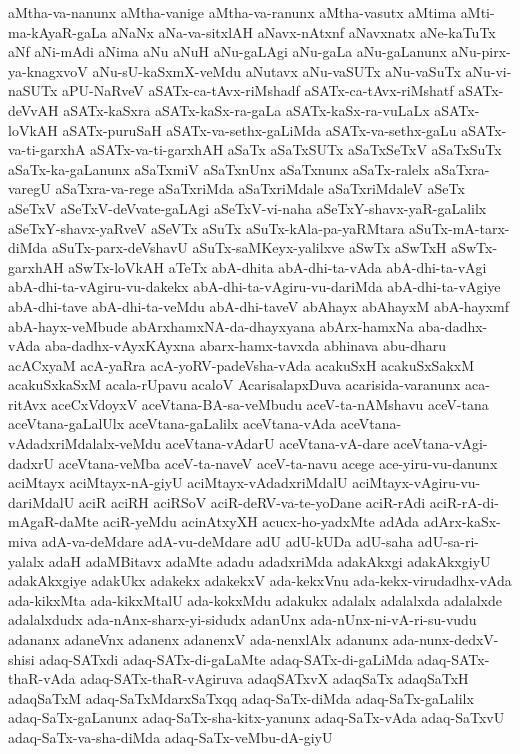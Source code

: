 {aMtha-va-nanunx
aMtha-vanige
aMtha-va-ranunx
aMtha-vasutx
aMtima
aMti-ma-kAyaR-gaLa
aNaNx
aNa-va-sitxlAH
aNavx-nAtxnf
aNavxnatx
aNe-kaTuTx
aNf
aNi-mAdi
aNima
aNu
aNuH
aNu-gaLAgi
aNu-gaLa
aNu-gaLanunx
aNu-pirx-ya-knagxvoV
aNu-sU-kaSxmX-veMdu
aNutavx
aNu-vaSUTx
aNu-vaSuTx
aNu-vi-naSUTx
aPU-NaRveV
aSATx-ca-tAvx-riMshadf
aSATx-ca-tAvx-riMshatf
aSATx-deVvAH
aSATx-kaSxra
aSATx-kaSx-ra-gaLa
aSATx-kaSx-ra-vuLaLx
aSATx-loVkAH
aSATx-puruSaH
aSATx-va-sethx-gaLiMda
aSATx-va-sethx-gaLu
aSATx-va-ti-garxhA
aSATx-va-ti-garxhAH
aSaTx
aSaTxSUTx
aSaTxSeTxV
aSaTxSuTx
aSaTx-ka-gaLanunx
aSaTxmiV
aSaTxnUnx
aSaTxnunx
aSaTx-ralelx
aSaTxra-varegU
aSaTxra-va-rege
aSaTxriMda
aSaTxriMdale
aSaTxriMdaleV
aSeTx
aSeTxV
aSeTxV-deVvate-gaLAgi
aSeTxV-vi-naha
aSeTxY-shavx-yaR-gaLalilx
aSeTxY-shavx-yaRveV
aSeVTx
aSuTx
aSuTx-kAla-pa-yaRMtara
aSuTx-mA-tarx-diMda
aSuTx-parx-deVshavU
aSuTx-saMKeyx-yalilxve
aSwTx
aSwTxH
aSwTx-garxhAH
aSwTx-loVkAH
aTeTx
abA-dhita
abA-dhi-ta-vAda
abA-dhi-ta-vAgi
abA-dhi-ta-vAgiru-vu-dakekx
abA-dhi-ta-vAgiru-vu-dariMda
abA-dhi-ta-vAgiye
abA-dhi-tave
abA-dhi-ta-veMdu
abA-dhi-taveV
abAhayx
abAhayxM
abA-hayxmf
abA-hayx-veMbude
abArxhamxNA-da-dhayxyana
abArx-hamxNa
aba-dadhx-vAda
aba-dadhx-vAyxKAyxna
abarx-hamx-tavxda
abhinava
abu-dharu
acACxyaM
acA-yaRra
acA-yoRV-padeVsha-vAda
acakuSxH
acakuSxSakxM
acakuSxkaSxM
acala-rUpavu
acaloV
AcarisalapxDuva
acarisida-varanunx
aca-ritAvx
aceCxVdoyxV
aceVtana-BA-sa-veMbudu
aceV-ta-nAMshavu
aceV-tana
aceVtana-gaLalUlx
aceVtana-gaLalilx
aceVtana-vAda
aceVtana-vAdadxriMdalalx-veMdu
aceVtana-vAdarU
aceVtana-vA-dare
aceVtana-vAgi-dadxrU
aceVtana-veMba
aceV-ta-naveV
aceV-ta-navu
acege
ace-yiru-vu-danunx
aciMtayx
aciMtayx-nA-giyU
aciMtayx-vAdadxriMdalU
aciMtayx-vAgiru-vu-dariMdalU
aciR
aciRH
aciRSoV
aciR-deRV-va-te-yoDane
aciR-rAdi
aciR-rA-di-mAgaR-daMte
aciR-yeMdu
acinAtxyXH
acucx-ho-yadxMte
adAda
adArx-kaSx-miva
adA-va-deMdare
adA-vu-deMdare
adU
adU-kUDa
adU-saha
adU-sa-ri-yalalx
adaH
adaMBitavx
adaMte
adadu
adadxriMda
adakAkxgi
adakAkxgiyU
adakAkxgiye
adakUkx
adakekx
adakekxV
ada-kekxVnu
ada-kekx-virudadhx-vAda
ada-kikxMta
ada-kikxMtalU
ada-kokxMdu
adakukx
adalalx
adalalxda
adalalxde
adalalxdudx
ada-nAnx-sharx-yi-sidudx
adanUnx
ada-nUnx-ni-vA-ri-su-vudu
adananx
adaneVnx
adanenx
adanenxV
ada-nenxlAlx
adanunx
ada-nunx-dedxV-shisi
adaq-SATxdi
adaq-SATx-di-gaLaMte
adaq-SATx-di-gaLiMda
adaq-SATx-thaR-vAda
adaq-SATx-thaR-vAgiruva
adaqSATxvX
adaqSaTx
adaqSaTxH
adaqSaTxM
adaq-SaTxMdarxSaTxqq
adaq-SaTx-diMda
adaq-SaTx-gaLalilx
adaq-SaTx-gaLanunx
adaq-SaTx-sha-kitx-yanunx
adaq-SaTx-vAda
adaq-SaTxvU
adaq-SaTx-va-sha-diMda
adaq-SaTx-veMbu-dA-giyU
}
